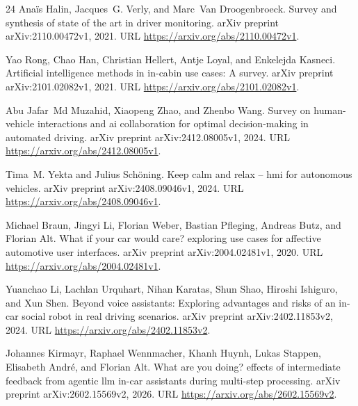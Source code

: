 \documentclass[11pt,a4paper]{article}
\begin{document}
\begin{thebibliography}{24}
Anaïs Halin, Jacques~G. Verly, and Marc~Van Droogenbroeck.
\newblock Survey and synthesis of state of the art in driver monitoring.
\newblock arXiv preprint arXiv:2110.00472v1, 2021.
\newblock URL \url{https://arxiv.org/abs/2110.00472v1}.

Yao Rong, Chao Han, Christian Hellert, Antje Loyal, and Enkelejda Kasneci.
\newblock Artificial intelligence methods in in-cabin use cases: A survey.
\newblock arXiv preprint arXiv:2101.02082v1, 2021.
\newblock URL \url{https://arxiv.org/abs/2101.02082v1}.

Abu Jafar~Md Muzahid, Xiaopeng Zhao, and Zhenbo Wang.
\newblock Survey on human-vehicle interactions and ai collaboration for optimal
  decision-making in automated driving.
\newblock arXiv preprint arXiv:2412.08005v1, 2024.
\newblock URL \url{https://arxiv.org/abs/2412.08005v1}.

Tima~M. Yekta and Julius Schöning.
\newblock Keep calm and relax -- hmi for autonomous vehicles.
\newblock arXiv preprint arXiv:2408.09046v1, 2024.
\newblock URL \url{https://arxiv.org/abs/2408.09046v1}.

Michael Braun, Jingyi Li, Florian Weber, Bastian Pfleging, Andreas Butz, and
  Florian Alt.
\newblock What if your car would care? exploring use cases for affective
  automotive user interfaces.
\newblock arXiv preprint arXiv:2004.02481v1, 2020{}.
\newblock URL \url{https://arxiv.org/abs/2004.02481v1}.

Yuanchao Li, Lachlan Urquhart, Nihan Karatas, Shun Shao, Hiroshi Ishiguro, and
  Xun Shen.
\newblock Beyond voice assistants: Exploring advantages and risks of an in-car
  social robot in real driving scenarios.
\newblock arXiv preprint arXiv:2402.11853v2, 2024.
\newblock URL \url{https://arxiv.org/abs/2402.11853v2}.

Johannes Kirmayr, Raphael Wennmacher, Khanh Huynh, Lukas Stappen, Elisabeth
  André, and Florian Alt.
\newblock What are you doing? effects of intermediate feedback from agentic llm
  in-car assistants during multi-step processing.
\newblock arXiv preprint arXiv:2602.15569v2, 2026{}.
\newblock URL \url{https://arxiv.org/abs/2602.15569v2}.


\end{thebibliography}
\end{document}

